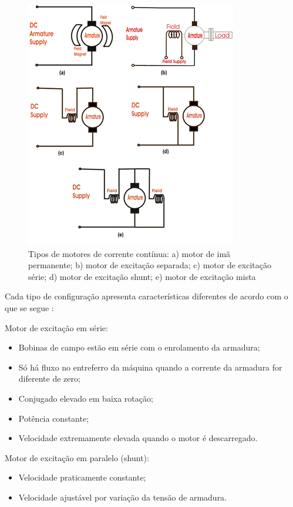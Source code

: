 \begin{anexosenv}
\begin{figure}[htb]
		\centering
			\includegraphics[scale=0.9]{figuras/motores2.png}
		\caption{Tipos de motores de corrente contínua: a) motor de imã permanente; b) motor de excitação separada; c) motor de excitação série; d) motor de excitação shunt; e) motor de excitação mista \cite{siteeducation}}
		\label{fig20}
\end{figure}

Cada tipo de configuração apresenta características diferentes de acordo com o que se segue \cite{siemens}:

\par \vspace{\baselineskip}
\par \vspace{\baselineskip}

\noindent
Motor de excitação em série:
\begin{itemize}
	\item Bobinas de campo estão em série com o  enrolamento da armadura;
	\item Só há fluxo no entreferro da máquina quando a corrente da armadura for diferente de zero;
	\item Conjugado elevado em baixa rotação;
	\item Potência constante;	
	\item Velocidade extremamente elevada quando o motor é descarregado.
\end{itemize}

\noindent
Motor de excitação em paralelo (shunt):
\begin{itemize}
	\item Velocidade praticamente constante;
	\item Velocidade ajustável por variação da tensão de armadura.
\end{itemize}


\end{anexosenv}
